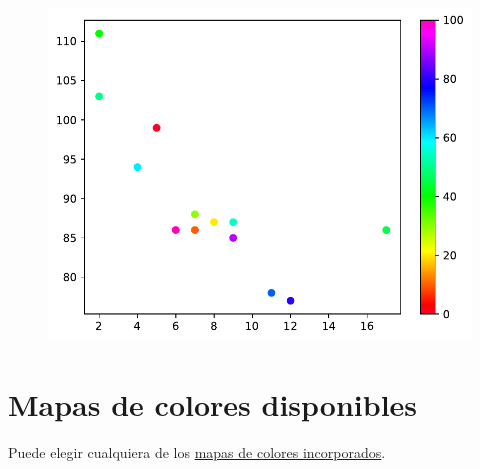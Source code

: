 \begin{code}
\begin{figure}
  \centering
  \includegraphics[scale=0.6]{img/grafica1041.pdf}
\end{figure}
\end{code}

\section{Mapas de colores disponibles}

Puede elegir cualquiera de los
\href{https://matplotlib.org/stable/users/explain/colors/colormaps.html}{mapas
de colores incorporados}.

\begin{Shaded}
\begin{Highlighting}[]
\end{Highlighting}
\end{Shaded}

